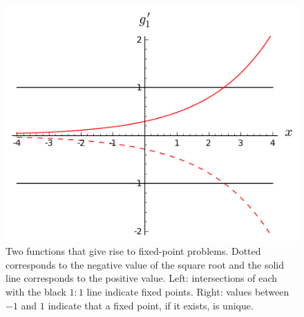 \documentclass[11pt]{article}
\begin{document}
\begin{figure}[ht!]
\begin{minipage}{0.48\textwidth}
\includegraphics[width=\textwidth]{1_basics/g1p.png}
\end{minipage}
\caption{Two functions that give rise to fixed-point problems. Dotted corresponds to the negative value of the square root and the solid line corresponds to the positive value. Left: intersections of each with the black \(1:1\) line indicate fixed points. Right: values between \(-1\) and \(1\) indicate that a fixed point, if it exists, is unique.}\label{fig::g1}
\end{figure}
\end{document}
